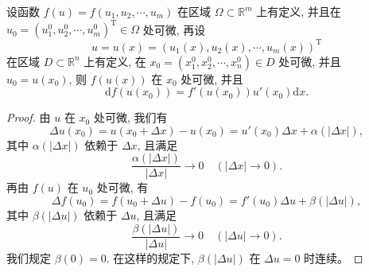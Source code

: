 \documentclass[UTF8,12pt,a4paper,fontset=fandol]{ctexart}
\begin{document}
\begin{theorem}\label{course-theorem-14-2-2}\quad 设函数 $f(u)=f(u_1,u_2,\cdots,u_m)$ 在区域 $\Omega\subset\mathbb R^m$ 上有定义, 并且在 $u_0=(u_1^0,u_2^0,\cdots,u_m^0)^\mathrm T\in\Omega$ 处可微, 再设
\[
  u=u(x)=(u_1(x),u_2(x),\cdots,u_m(x))^\mathrm T
\]
在区域 $D\subset\mathbb R^n$ 上有定义, 在 $x_0=(x_1^0,x_2^0,\cdots,x_n^0)\in D$ 处可微, 并且 $u_0=u(x_0)$, 则 $f(u(x))$ 在 $x_0$ 处可微, 并且
\[
  \mathrm df(u(x_0))=f'(u(x_0))u'(x_0)\mathrm dx.
\]

\end{theorem}
\begin{proof}\quad 由 $u$ 在 $x_0$ 处可微, 我们有
\[
  \Delta u(x_0)=u(x_0+\Delta x)-u(x_0)
  =u'(x_0)\Delta x+\alpha(|\Delta x|),
\]
其中 $\alpha(|\Delta x|)$ 依赖于 $\Delta x$, 且满足
\[
  \frac{\alpha(|\Delta x|)}{|\Delta x|}\to0\quad(|\Delta x|\to0).
\]
再由 $f(u)$ 在 $u_0$ 处可微, 有
\[
  \Delta f(u_0)=f(u_0+\Delta u)-f(u_0)=f'(u_0)\Delta u+\beta(|\Delta u|),
\]
其中 $\beta(|\Delta u|)$ 依赖于 $\Delta u$, 且满足
\[
  \frac{\beta(|\Delta u|)}{|\Delta u|}\to0\quad(|\Delta u|\to0).
\]
我们规定 $\beta(0)=0$. 在这样的规定下, $\beta(|\Delta u|)$ 在 $\Delta u=0$ 时连续。


\end{proof}
\end{document}

